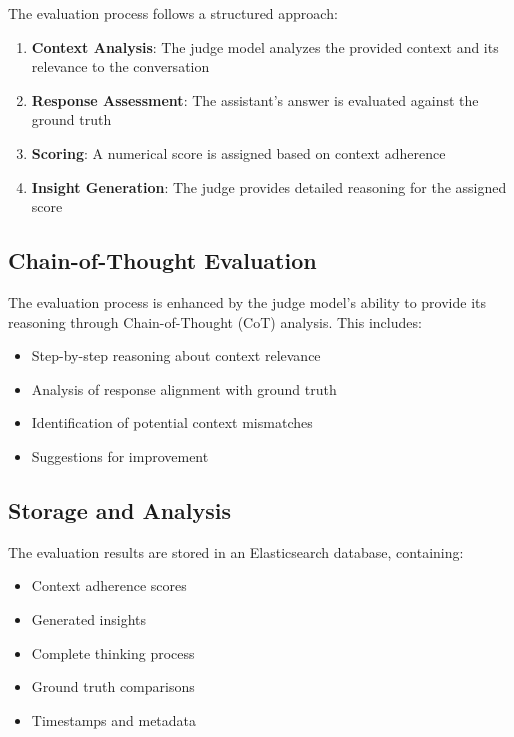 \documentclass[12pt]{article}
\begin{document}
The evaluation process follows a structured approach:

\begin{enumerate}
    \item \textbf{Context Analysis}: The judge model analyzes the provided context and its relevance to the conversation
    \item \textbf{Response Assessment}: The assistant's answer is evaluated against the ground truth
    \item \textbf{Scoring}: A numerical score is assigned based on context adherence
    \item \textbf{Insight Generation}: The judge provides detailed reasoning for the assigned score
\end{enumerate}

\subsection{Chain-of-Thought Evaluation}

The evaluation process is enhanced by the judge model's ability to provide its reasoning through Chain-of-Thought (CoT) analysis. This includes:

\begin{itemize}
    \item Step-by-step reasoning about context relevance
    \item Analysis of response alignment with ground truth
    \item Identification of potential context mismatches
    \item Suggestions for improvement
\end{itemize}

\subsection{Storage and Analysis}

The evaluation results are stored in an Elasticsearch database, containing:

\begin{itemize}
    \item Context adherence scores
    \item Generated insights
    \item Complete thinking process
    \item Ground truth comparisons
    \item Timestamps and metadata
\end{itemize}
\end{document}
